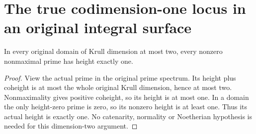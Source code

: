 \section{The true codimension-one locus in an original integral surface}
\begin{theorem}\label{thm:surface-nonclosed-nonzero-prime-height}
In every original domain of Krull dimension at most two, every nonzero nonmaximal prime has height exactly one.
\leanok
\end{theorem}
\begin{proof}
View the actual prime in the original prime spectrum. Its height plus coheight is at most the whole original Krull dimension, hence at most two. Nonmaximality gives positive coheight, so its height is at most one. In a domain the only height-zero prime is zero, so its nonzero height is at least one. Thus its actual height is exactly one. No catenarity, normality or Noetherian hypothesis is needed for this dimension-two argument.
\end{proof}
